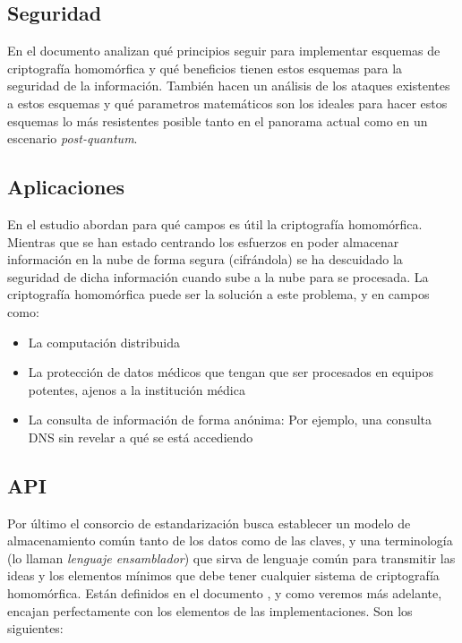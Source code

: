 \subsection{Seguridad}

En el documento \cite{chase_security_2017} analizan qué principios seguir para implementar esquemas de criptografía homomórfica y qué beneficios tienen estos esquemas para la seguridad de la información. También hacen un análisis de los ataques existentes a estos esquemas y qué parametros matemáticos son los ideales para hacer estos esquemas lo más resistentes posible tanto en el panorama actual como en un escenario \textit{post-quantum}.

\subsection{Aplicaciones}

En el estudio \cite{archer_applications_2017} abordan para qué campos es útil la criptografía homomórfica. Mientras que se han estado centrando los esfuerzos en poder almacenar información en la nube de forma segura (cifrándola) se ha descuidado la seguridad de dicha información cuando sube a la nube para se procesada. La criptografía homomórfica puede ser la solución a este problema, y en campos como:

\begin{itemize}
    \item La computación distribuida
    \item La protección de datos médicos que tengan que ser procesados en equipos potentes, ajenos a la institución médica
    \item La consulta de información de forma anónima: Por ejemplo, una consulta DNS sin revelar a qué se está accediendo
\end{itemize}

\subsection{API}

Por último el consorcio de estandarización busca establecer un modelo de almacenamiento común tanto de los datos como de las claves, y una terminología (lo llaman \textit{lenguaje ensamblador}) que sirva de lenguaje común para transmitir las ideas y los elementos mínimos que debe tener cualquier sistema de criptografía homomórfica. Están definidos en el documento \cite{brenner_standard_2017}, y como veremos más adelante, encajan perfectamente con los elementos de las implementaciones. Son los siguientes:

